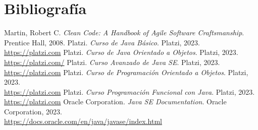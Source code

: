 \documentclass[executivepaper]{article}
\begin{document}
\section{Bibliografía}
\begin{thebibliography}{9}
 Martin, Robert C. \textit{Clean Code: A Handbook of Agile Software Craftsmanship}. Prentice Hall, 2008.
 Platzi. \textit{Curso de Java Básico}. Platzi, 2023.\\ \url{https://platzi.com}
 Platzi. \textit{Curso de Java Orientado a Objetos}. Platzi, 2023.\\ \url{https://platzi.com/}
 Platzi. \textit{Curso Avanzado de Java SE}. Platzi, 2023.\\ \url{https://platzi.com}
 Platzi. \textit{Curso de Programación Orientado a Objetos}. Platzi, 2023.\\ \url{https://platzi.com}
 Platzi. \textit{Curso Programación Funcional con Java}. Platzi, 2023.\\ \url{https://platzi.com}
 Oracle Corporation. \textit{Java SE Documentation}. Oracle Corporation, 2023.\\ \url{https://docs.oracle.com/en/java/javase/index.html}
\end{thebibliography}
\end{document}
